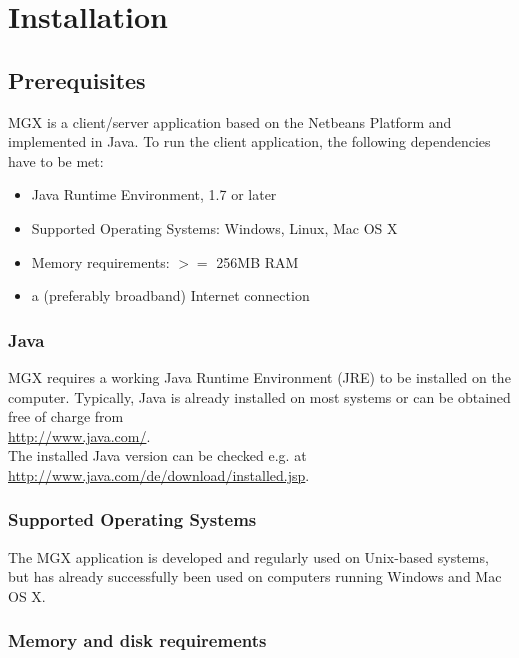 
\chapter{Installation}
\label{installation}

\section{Prerequisites}

MGX is a client/server application based on the Netbeans Platform and implemented
in Java. To run the client application, the following dependencies have to be
met:

\begin{itemize}
  \item Java Runtime Environment, 1.7 or later
  \item Supported Operating Systems: Windows, Linux, Mac OS X
  \item Memory requirements: $>=$ 256MB RAM
  \item a (preferably broadband) Internet connection
\end{itemize}

\subsection{Java}

MGX requires a working Java Runtime Environment (JRE) to be installed on the computer. Typically,
Java is already installed on most systems or can be obtained free of charge from\\

\url{http://www.java.com/}.\\

The installed Java version can be checked e.g. at\\

\url{http://www.java.com/de/download/installed.jsp}.

\subsection{Supported Operating Systems}

The MGX application is developed and regularly used on Unix-based systems,
but has already successfully been used on computers running Windows and
Mac OS X.

\subsection{Memory and disk requirements}

